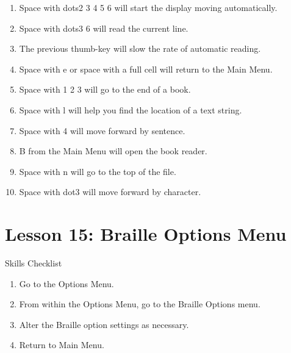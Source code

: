 \documentclass[10pt,letterpaper,twoside]{report}
\begin{document}
{{{{\begin{enumerate}
	\item Space with dots2 3 4 5 6 will start the display moving automatically.
	      
	\item Space with dots3 6 will read the current line.
	      
	\item The previous thumb-key will slow the rate of automatic reading.
	      
	\item Space with e or space with a full cell will return to the Main Menu.
	      
	\item Space with 1 2 3 will go to the end of a book.
	      
	\item Space with l will help you find the location of a text string.
	      
	\item Space with 4 will move forward by sentence.
	      
	\item B from the Main Menu will open the book reader.
	      
	\item Space with n will go to the top of the file.
	      
	\item Space with dot3 will move forward by character.
\end{enumerate}

\section*{Lesson 15: Braille Options Menu}


Skills Checklist



\begin{enumerate}
	\item Go to the Options Menu.
	      
	\item From within the Options Menu, go to the Braille Options menu.
	      
	\item Alter the Braille option settings as necessary.
	      
	\item Return to Main Menu.
\end{enumerate}



}}}}
\end{document}
